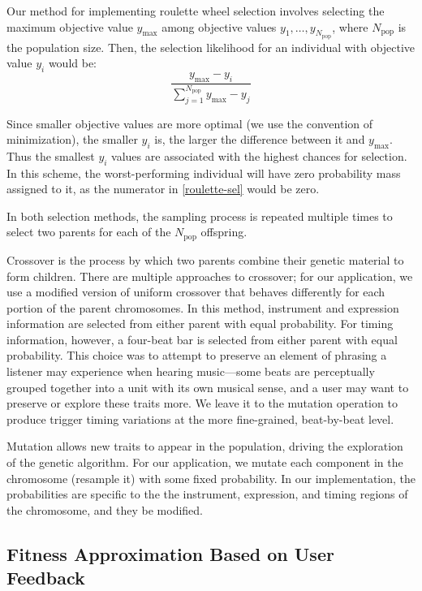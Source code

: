 \documentclass[conference]{IEEEtran}
\begin{document}
Our method for implementing roulette wheel selection involves selecting the
maximum objective value $y_\text{max}$ among objective values
$y_1, \dots, y_{N_\text{pop}}$, where $N_\text{pop}$ is the population size.
Then, the selection likelihood for an individual with objective value
$y_i$ would be:
%
\begin{equation}
    \frac{y_\text{max} -
    y_i}{\sum_{j=1}^{N_\text{pop}} y_\text{max}
    - y_j}\label{roulette-sel}
\end{equation}

Since smaller objective values are more optimal (we use the convention of
minimization), the smaller $y_i$ is, the larger the difference
between it and $y_\text{max}$. Thus the smallest $y_i$
values are associated with the highest chances for selection. In this scheme,
the worst-performing individual will have zero probability mass assigned to it,
as the numerator in \eqref{roulette-sel} would be zero.

In both selection methods, the sampling process is repeated multiple times to
select two parents for each of the $N_\text{pop}$ offspring.

Crossover is the process by which two parents combine their genetic material to
form children. There are multiple approaches to crossover; for our application,
we use a modified version of uniform crossover that behaves differently for
each portion of the parent chromosomes. In this method, instrument and
expression information are selected from either parent with equal probability.
For timing information, however, a four-beat bar is selected from either parent
with equal probability. This choice was to attempt to preserve an element of
phrasing a listener may experience when hearing music—some beats are
perceptually grouped together into a unit with its own musical sense, and a
user may want to preserve or explore these traits more. We leave it to the
mutation operation to produce trigger timing variations at the more
fine-grained, beat-by-beat level.

Mutation allows new traits to appear in the population, driving the exploration
of the genetic algorithm. For our application, we mutate each component in the
chromosome (resample it) with some fixed probability. In our implementation,
the probabilities are specific to the the instrument, expression, and timing
regions of the chromosome, and they be modified.

\subsection{Fitness Approximation Based on User Feedback}
\end{document}
